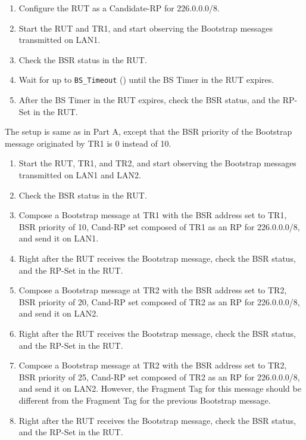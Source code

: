 \documentclass[11pt]{report}
\begin{document}
\begin{enumerate}

  \item Configure the RUT as a Candidate-RP for 226.0.0.0/8.

  \item Start the RUT and TR1, and start observing the Bootstrap messages
  transmitted on LAN1.

  \item Check the BSR status in the RUT.

  \item Wait for up to \verb=BS_Timeout= ({\PimsmBSTimeout}) until the BS
  Timer in the RUT expires.

  \item After the BS Timer in the RUT expires, check the BSR status, and the
  RP-Set in the RUT.

\end{enumerate}


The setup is same as in Part A, except that the BSR priority of the Bootstrap
message originated by TR1 is 0 instead of 10.


\begin{enumerate}

  \item Start the RUT, TR1, and TR2, and start observing the Bootstrap messages
  transmitted on LAN1 and LAN2.

  \item Check the BSR status in the RUT.

  \item Compose a Bootstrap message at TR1 with the BSR address set to TR1,
  BSR priority of 10, Cand-RP set composed of TR1 as an RP for 226.0.0.0/8,
  and send it on LAN1.

  \item Right after the RUT receives the Bootstrap message, check the BSR
  status, and the RP-Set in the RUT.

  \item Compose a Bootstrap message at TR2 with the BSR address set to TR2,
  BSR priority of 20, Cand-RP set composed of TR2 as an RP for 226.0.0.0/8,
  and send it on LAN2.

  \item Right after the RUT receives the Bootstrap message, check the BSR
  status, and the RP-Set in the RUT.

  \item Compose a Bootstrap message at TR2 with the BSR address set to TR2,
  BSR priority of 25, Cand-RP set composed of TR2 as an RP for 226.0.0.0/8,
  and send it on LAN2. However, the Fragment Tag for this message should be
  different from the Fragment Tag for the previous Bootstrap message.

  \item Right after the RUT receives the Bootstrap message, check the BSR
  status, and the RP-Set in the RUT.

\end{enumerate}
\end{document}
